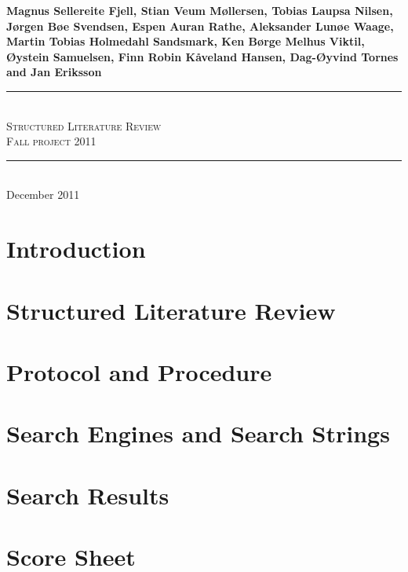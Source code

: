 \documentclass[11pt,a4paper,openany]{article}
\newcommand{\slrTitle}{Structured Literature Review}
\newcommand{\slrSubtitle}{Fall project 2011}
\newcommand{\slrMadeby}{Magnus Sellereite Fjell, Stian Veum M{\o}llersen, Tobias Laupsa Nilsen, J{\o}rgen B{\o}e Svendsen, Espen Auran Rathe, Aleksander Lun{\o}e Waage, Martin Tobias Holmedahl Sandsmark, Ken B{\o}rge Melhus Viktil, {\O}ystein Samuelsen, Finn Robin K{\aa}veland Hansen, Dag-{\O}yvind Tornes and Jan Eriksson}
\newcommand{\slrDate}{December 2011}
\newcommand{\Hline}{\rule{\linewidth}{0.3mm} \\}
\begin{document}
\begin{titlepage}
\center
\large \textbf{\slrMadeby}

\vspace{3cm}
\Hline
\Huge \textsc{\slrTitle}
\vspace{2cm}
\huge \\ \textsc{\slrSubtitle}
\Hline
\vfill
\normalsize \slrDate

\end{titlepage}

\section{Introduction}


\section{Structured Literature Review}


\section{Protocol and Procedure}


\section{Search Engines and Search Strings}


\section{Search Results}


\section{Score Sheet}


\label{biblio}
 
\end{document}

